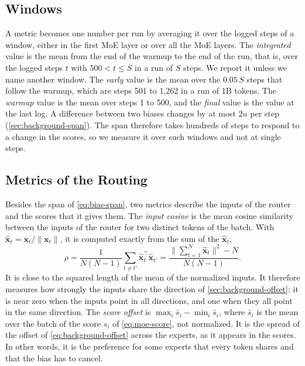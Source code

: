 \subsection{Windows}
\label{sec:method-windows}
A metric becomes one number per run by averaging it over the logged steps of a window, either in the first MoE layer or over all the MoE layers. The \emph{integrated} value is the mean from the end of the warmup to the end of the run, that is, over the logged steps $t$ with $500 < t \leq S$ in a run of $S$ steps. We report it unless we name another window. The \emph{early} value is the mean over the $0.05\,S$ steps that follow the warmup, which are steps 501 to 1,262 in a run of 1B tokens. The \emph{warmup} value is the mean over steps 1 to 500, and the \emph{final} value is the value at the last log. A difference between two biases changes by at most $2u$ per step (\cref{sec:background-span}). The span therefore takes hundreds of steps to respond to a change in the scores, so we measure it over such windows and not at single steps.

\subsection{Metrics of the Routing}
\label{sec:method-readings}
Besides the span of \cref{eq:bias-span}, two metrics describe the inputs of the router and the scores that it gives them. The \emph{input cosine} is the mean cosine similarity between the inputs of the router for two distinct tokens of the batch. With $\hat{\mathbf{x}}_t = \mathbf{x}_t / \lVert \mathbf{x}_t \rVert$, it is computed exactly from the sum of the $\hat{\mathbf{x}}_t$,
\begin{equation}[eq:method-cosine]{}
  \rho = \frac{1}{N (N - 1)} \sum_{t \neq t'} \hat{\mathbf{x}}_t^{\top} \hat{\mathbf{x}}_{t'} = \frac{\bigl\lVert \sum_{t=1}^{N} \hat{\mathbf{x}}_t \bigr\rVert^2 - N}{N (N - 1)}.
\end{equation}
It is close to the squared length of the mean of the normalized inputs. It therefore measures how strongly the inputs share the direction of \cref{sec:background-offset}: it is near zero when the inputs point in all directions, and one when they all point in the same direction. The \emph{score offset} is $\max_i \bar{s}_i - \min_i \bar{s}_i$, where $\bar{s}_i$ is the mean over the batch of the score $s_i$ of \cref{eq:moe-score}, not normalized. It is the spread of the offset of \cref{eq:background-offset} across the experts, as it appears in the scores. In other words, it is the preference for some experts that every token shares and that the bias has to cancel.

